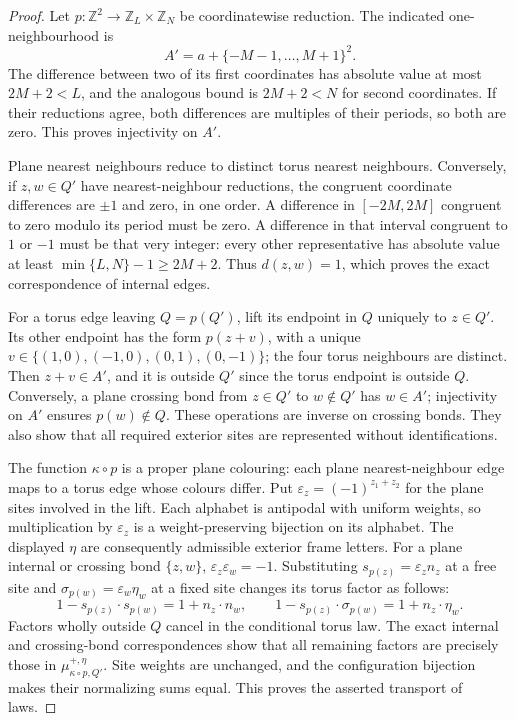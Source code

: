 \begin{proof}
Let \(p:\mathbb Z^2\to\mathbb Z_L\times\mathbb Z_N\) be
coordinatewise reduction. The indicated one-neighbourhood is
\[
 A'=a+\{-M-1,\ldots,M+1\}^2.
\]
The difference between two of its first coordinates has absolute
value at most \(2M+2<L\), and the analogous bound is
\(2M+2<N\) for second coordinates. If their reductions agree,
both differences are multiples of their periods, so both are zero.
This proves injectivity on \(A'\).

Plane nearest neighbours reduce to distinct torus nearest neighbours.
Conversely, if \(z,w\in Q'\) have nearest-neighbour reductions,
the congruent coordinate differences are \(\pm1\) and zero,
in one order. A difference in \([-2M,2M]\) congruent to zero
modulo its period must be zero. A difference in that interval
congruent to \(1\) or \(-1\) must be that very integer:
every other representative has absolute value at least
\(\min\{L,N\}-1\ge2M+2\). Thus \(d(z,w)=1\), which
proves the exact correspondence of internal edges.

For a torus edge leaving \(Q=p(Q')\), lift its endpoint in \(Q\)
uniquely to \(z\in Q'\). Its other endpoint has the form
\(p(z+v)\), with a unique
\(v\in\{(1,0),(-1,0),(0,1),(0,-1)\}\); the four torus
neighbours are distinct. Then \(z+v\in A'\), and it is outside
\(Q'\) since the torus endpoint is outside \(Q\).
Conversely, a plane crossing bond from \(z\in Q'\) to
\(w\notin Q'\) has \(w\in A'\); injectivity on \(A'\)
ensures \(p(w)\notin Q\). These operations are inverse on
crossing bonds. They also show that all required exterior sites
are represented without identifications.

The function \(\kappa\circ p\) is a proper plane colouring:
each plane nearest-neighbour edge maps to a torus edge whose
colours differ. Put \(\varepsilon_z=(-1)^{z_1+z_2}\) for the
plane sites involved in the lift. Each alphabet is antipodal with
uniform weights, so multiplication by \(\varepsilon_z\) is a
weight-preserving bijection on its alphabet. The displayed \(\eta\)
are consequently admissible exterior frame letters.
For a plane internal or crossing bond \(\{z,w\}\),
\(\varepsilon_z\varepsilon_w=-1\). Substituting
\(s_{p(z)}=\varepsilon_z n_z\) at a free site and
\(\sigma_{p(w)}=\varepsilon_w\eta_w\) at a fixed site changes
its torus factor as follows:
\[
 1-s_{p(z)}\cdot s_{p(w)}=1+n_z\cdot n_w,
 \qquad
 1-s_{p(z)}\cdot\sigma_{p(w)}=1+n_z\cdot\eta_w.
\]
Factors wholly outside \(Q\) cancel in the conditional torus
law. The exact internal and crossing-bond correspondences show
that all remaining factors are precisely those in
\(\mu^{+,\eta}_{\kappa\circ p,Q'}\). Site weights are unchanged,
and the configuration bijection makes their normalizing sums
equal. This proves the asserted transport of laws.


\end{proof}
